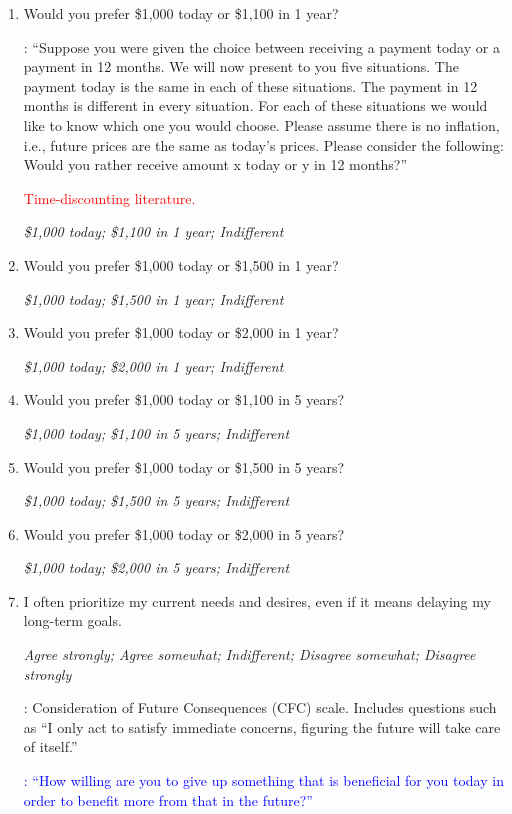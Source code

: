 \documentclass[11pt, headsepline]{article}
\newcommand{\blue}[1]{\textcolor{blue}{#1}}
\newcommand{\red}[1]{\textcolor{red}{#1}}
\newcommand{\green}[1]{\textcolor{sharpgreen}{#1}}
\begin{document}
\begin{enumerate}[resume]

    \item Would you prefer \$1,000 today or \$1,100 in 1 year?

    \green{\cite{falk2018global}: ``Suppose you were given the choice between receiving a payment today or a payment in 12 months. We will now present to you five situations. The payment today is the same in each of these situations. The payment in 12 months is different in every situation. For each of these situations we would like to know which one you would choose. Please assume there is no inflation, i.e., future prices are the same as today’s prices. Please consider the following: Would you rather receive amount x today or y in 12 months?''} 
    
    \red{Time-discounting literature.}

    \textit{\$1,000 today; \$1,100 in 1 year; Indifferent}

    \item Would you prefer \$1,000 today or \$1,500 in 1 year?

    \textit{\$1,000 today; \$1,500 in 1 year; Indifferent}

    \item Would you prefer \$1,000 today or \$2,000 in 1 year?

    \textit{\$1,000 today; \$2,000 in 1 year; Indifferent}

    \item Would you prefer \$1,000 today or \$1,100 in 5 years?

    \textit{\$1,000 today; \$1,100 in 5 years; Indifferent}

    \item Would you prefer \$1,000 today or \$1,500 in 5 years?

    \textit{\$1,000 today; \$1,500 in 5 years; Indifferent}

    \item Would you prefer \$1,000 today or \$2,000 in 5 years?

    \textit{\$1,000 today; \$2,000 in 5 years; Indifferent}

    \item I often prioritize my current needs and desires, even if it means delaying my long-term goals.

    \textit{Agree strongly; Agree somewhat; Indifferent; Disagree somewhat; Disagree strongly}

    \green{\cite{strathman1994consideration}: Consideration of Future Consequences (CFC) scale. Includes questions such as ``I only act to satisfy immediate concerns, figuring the future will take care of itself.''}

    \blue{\cite{falk2018global}: ``How willing are you to give up something that is beneficial for you today in order to benefit more from that in the future?''}
    
\end{enumerate}
\end{document}
